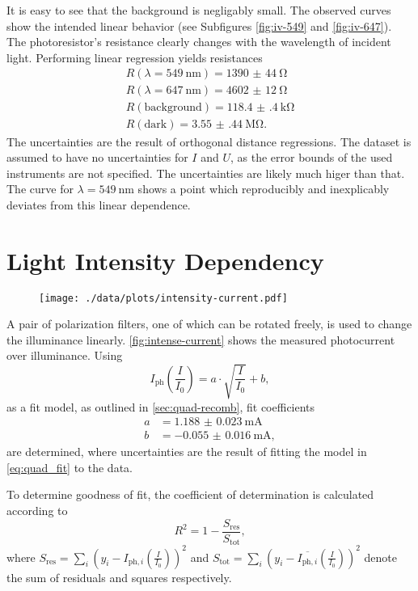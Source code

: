 It is easy to see that the background is negligably small.
The observed curves show the intended linear behavior (see Subfigures \ref{fig:iv-549} and \ref{fig:iv-647}).
The photoresistor's resistance clearly changes with the wavelength of incident light.
Performing linear regression yields resistances
\begin{align*}
  R(\lambda = \SI{549}{\nm}) = \SI{1390(44)}{\ohm} \\
  R(\lambda = \SI{647}{\nm}) = \SI{4602(12)}{\ohm} \\
  R(\text{background}) = \SI{118.4(4)}{\kilo\ohm} \\
  R(\text{dark}) = \SI{3.55(44)}{\mega\ohm}.
\end{align*}
The uncertainties are the result of orthogonal distance regressions.
The dataset is assumed to have no uncertainties for $I$ and $U$, as the error bounds of the used instruments are not specified.
The uncertainties are likely much higer than that.
The curve for $\lambda=\SI{549}{\nm}$ shows a point which reproducibly and inexplicably deviates from this linear dependence.

\section{Light Intensity Dependency}
\begin{figure}
	\centering
	\texttt{[image: ./data/plots/intensity-current.pdf]}
	\label{fig:intense-current}
\end{figure}
A pair of polarization filters, one of which can be rotated freely, is used to change the illuminance linearly.
\autoref{fig:intense-current} shows the measured photocurrent over illuminance.
Using
\begin{equation}\label{eq:quad_fit}
	I_\text{ph}\left(\frac{I}{I_0}\right) = a\cdot\sqrt{\frac{I}{I_0}} + b,
\end{equation}
as a fit model, as outlined in \autoref{sec:quad-recomb}, fit coefficients
\begin{align*}
	a &= \SI{1.188(23)}{\mA}	\\
	b &= \SI{-0.055(16)}{\mA},
\end{align*}
are determined, where uncertainties are the result of fitting the model in \autoref{eq:quad_fit} to the data.

To determine goodness of fit, the coefficient of determination is calculated according to
\begin{equation*}
	R^2 = 1 - \frac{S_\text{res}}{S_\text{tot}},
\end{equation*}
where $S_\text{res}=\sum_i\left(y_i - I_{\text{ph},i}\left(\frac{I}{I_0}\right)\right)^2$ and $S_\text{tot}=\sum_i\left(y_i - \overline{I_{\text{ph},i}}\left(\frac{I}{I_0}\right)\right)^2$ denote the sum of residuals and squares respectively.

